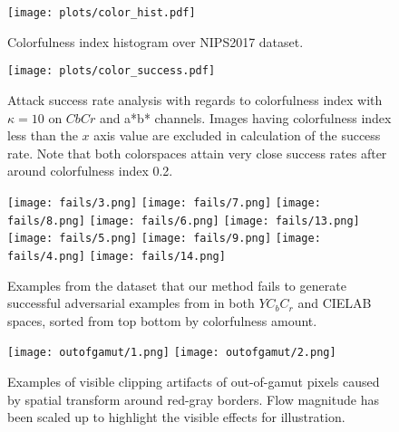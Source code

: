 
\begin{figure}[t]

    \begin{center}
        \texttt{[image: plots/color\_hist.pdf]}
    \end{center}
    \caption{Colorfulness index histogram over NIPS2017 dataset.}\label{fig:hist}
\end{figure}
\begin{figure}[t]
    \begin{center}
        \texttt{[image: plots/color\_success.pdf]}
    \end{center}
    \caption{Attack success rate analysis with regards to colorfulness index with \(\kappa=10\) on \(CbCr\) and a*b* channels. Images having colorfulness index less than the \(x\) axis value are excluded in calculation of the success rate. Note that both colorspaces attain very close success rates after around colorfulness index 0.2.} \label{fig:plots}
\end{figure}


\begin{figure}[t]
    \texttt{[image: fails/3.png]}
    \texttt{[image: fails/7.png]}
    \texttt{[image: fails/8.png]}
    \texttt{[image: fails/6.png]}
    \texttt{[image: fails/13.png]}
    \texttt{[image: fails/5.png]}
    \texttt{[image: fails/9.png]}
    \texttt{[image: fails/4.png]}
    \texttt{[image: fails/14.png]}
    \caption{Examples from the dataset that our method fails to generate successful adversarial examples from in both \(YC_{b}C_{r}\) and CIELAB spaces, sorted from top bottom by colorfulness amount.}\label{fig:fails}
\end{figure}


\begin{figure}[H]
    \texttt{[image: outofgamut/1.png]}
    \texttt{[image: outofgamut/2.png]}
    \caption{Examples of visible clipping artifacts of out-of-gamut pixels caused by spatial transform around red-gray borders. Flow magnitude has been scaled up to highlight the visible effects for illustration.}\label{fig:outofgamut}
\end{figure}

